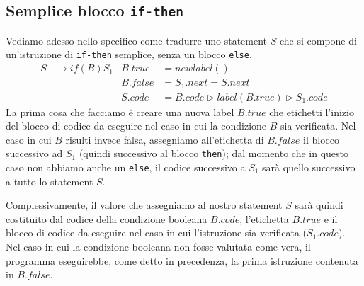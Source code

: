 \documentclass[class=book, crop=false, oneside, 12pt]{standalone}
\begin{document}
\subsection{Semplice blocco \texttt{if-then}}
Vediamo adesso nello specifico come tradurre uno statement \(S\) che si compone di un'istruzione di \texttt{if-then} semplice, senza un blocco \texttt{else}.
\begin{align*}
    S &\to if (B) S_1 & B.true &= newlabel() \\
    & & B.false &= S_1.next = S.next \\
    & & S.code &= B.code \triangleright label(B.true) \triangleright S_1.code
\end{align*}
La prima cosa che facciamo è creare una nuova label \(B.true\) che etichetti l'inizio del blocco di codice da eseguire nel caso in cui la condizione \(B\) sia verificata. Nel caso in cui \(B\) risulti invece falsa, assegniamo all'etichetta di \(B.false\) il blocco successivo ad \(S_1\) (quindi successivo al blocco \texttt{then}); dal momento che in questo caso non abbiamo anche un \texttt{else}, il codice successivo a \(S_1\) sarà quello successivo a tutto lo statement \(S\).

Complessivamente, il valore che assegniamo al nostro statement \(S\) sarà quindi costituito dal codice della condizione booleana \(B.code\), l'etichetta \(B.true\) e il blocco di codice da eseguire nel caso in cui l'istruzione sia verificata (\(S_1.code\)). Nel caso in cui la condizione booleana non fosse valutata come vera, il programma eseguirebbe, come detto in precedenza, la prima istruzione contenuta in \(B.false\). 
\end{document}
